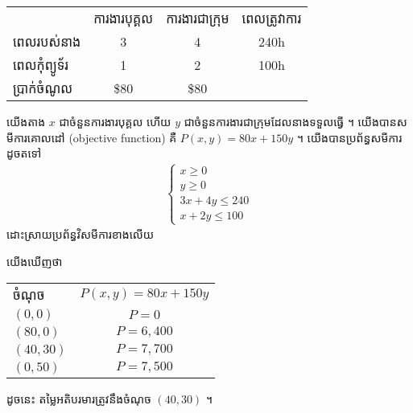 \begin{solution}
  \text{}
	\begin{center}
    \begin{tabular}{l c c c}
      \toprule
      {}         &ការងារបុគ្គល    &ការងារជាក្រុម   &ពេលត្រូវាការ \\
      \cmidrule(r){2-2}
      \cmidrule(r){3-3}
      \cmidrule(r){4-4}
      ពេលរបស់នាង &3            &4           &240h\\
      ពេលកុំព្យូទ័រ   &1            &2           &100h\\
      \hline
      ប្រាក់ចំណូល  &\$80         &\$80         &{}\\
      \bottomrule
    \end{tabular}
  \end{center}
  យើងតាង $x$ ជាចំនួនការងារបុគ្គល  ហើយ $y$ ជាចំនួនការងារជាក្រុមដែលនាងទទួលធ្វើ ។
  យើងបានសមីការគោលដៅ (objective function) គឺ $P(x,y) = 80x+150y$ ។
  យើងបានប្រព័ន្ធសមីការដូចតទៅ
  \begin{align*}
  	\begin{cases}
    	x\geq 0\\
      y\geq 0\\
      3x+4y \leq 240\\
      x+2y \leq 100
    \end{cases}
  \end{align*}
  ដោះស្រាយប្រព័ន្ធវិសមីការខាងលើយ
  \begin{center}
  \end{center}

  យើងឃើញថា
  \begin{center}
    \begin{tabular}{l c}
      \toprule
      ចំណុច       & $P(x,y)=80x+150y$\\
      \cmidrule(r){1-1} \cmidrule(l){2-2}
      $(0,0)$     & $P=0$\\
      $(80,0)$    & $P=6,400$\\
      $(40,30)$   & $P=7,700$\\
      $(0,50)$    & $P=7,500$\\
      \bottomrule
    \end{tabular}
  \end{center}
  ដូចនេះ តម្លៃអតិបរមារត្រូវនឹងចំណុច $(40,30)$ ។
\end{solution}






